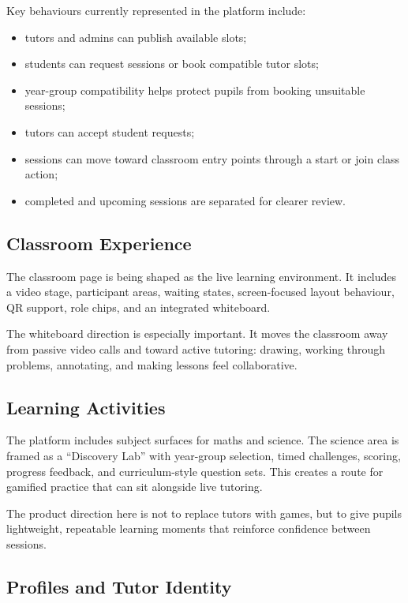 \documentclass[11pt,a4paper]{article}
\begin{document}
Key behaviours currently represented in the platform include:

\begin{itemize}
    \item tutors and admins can publish available slots;
    \item students can request sessions or book compatible tutor slots;
    \item year-group compatibility helps protect pupils from booking unsuitable sessions;
    \item tutors can accept student requests;
    \item sessions can move toward classroom entry points through a start or join class action;
    \item completed and upcoming sessions are separated for clearer review.
\end{itemize}

\subsection{Classroom Experience}

The classroom page is being shaped as the live learning environment. It includes a video stage, participant areas, waiting states, screen-focused layout behaviour, QR support, role chips, and an integrated whiteboard.

The whiteboard direction is especially important. It moves the classroom away from passive video calls and toward active tutoring: drawing, working through problems, annotating, and making lessons feel collaborative.

\subsection{Learning Activities}

The platform includes subject surfaces for maths and science. The science area is framed as a ``Discovery Lab'' with year-group selection, timed challenges, scoring, progress feedback, and curriculum-style question sets. This creates a route for gamified practice that can sit alongside live tutoring.

The product direction here is not to replace tutors with games, but to give pupils lightweight, repeatable learning moments that reinforce confidence between sessions.

\subsection{Profiles and Tutor Identity}
\end{document}
